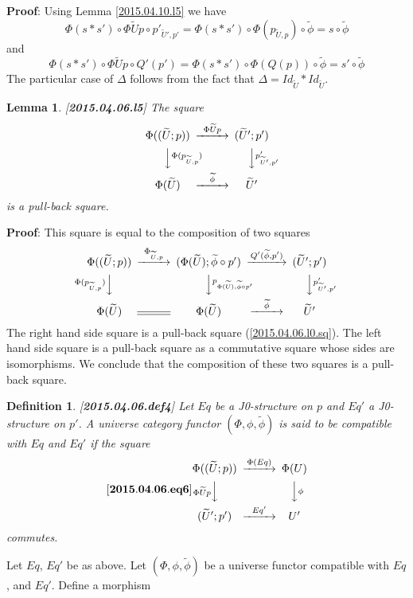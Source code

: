 \documentclass[12pt]{article}
\newenvironment{eq}{\begin{equation}}{\end{equation}}
\newenvironment{myproof}{{\bf Proof}:}{\vskip 5mm }
\newtheorem{lemma}[proposition]{Lemma}
\newtheorem{definition}[proposition]{Definition}
\newcommand{\llabel}[1]{\label{#1}[{\bf #1}]}
\newcommand{\wt}{\widetilde}
\begin{document}
%
\begin{myproof}
Using Lemma \ref{2015.04.10.l5} we have
%
$$\Phi(s*s')\circ \Phi\wt{U}p\circ p'_{\wt{U}',p'}=\Phi(s*s')\circ\Phi(p_{\wt{U},p})\circ\wt{\phi}=s\circ \wt{\phi}$$
%
and
%
$$\Phi(s*s')\circ \Phi\wt{U}p\circ Q'(p')=\Phi(s*s')\circ \Phi(Q(p))\circ \wt{\phi}=s'\circ\wt{\phi}$$
%
The particular case of $\Delta$ follows from the fact that $\Delta=Id_{\wt{U}}*Id_{\wt{U}}$. 
\end{myproof}
%
\begin{lemma}
\llabel{2015.04.06.l5}
The square
%
$$
\begin{CD}
\Phi((\wt{U};p)) @>\Phi\wt{U}p>> (\wt{U}';p')\\
@VV \Phi(p_{\wt{U},p}) V @VV p'_{\wt{U}',p'}V\\
\Phi(\wt{U}) @>\wt{\phi}>> \wt{U}'
\end{CD}
$$
%
is a pull-back square.
\end{lemma}
%
\begin{myproof}
This square is equal to the composition of two squares
%
$$
\begin{CD}
\Phi((\wt{U};p)) @>\Phi_{\wt{U},p}>> (\Phi(\wt{U});\wt{\phi}\circ p') @>Q'(\wt{\phi},p')>> (\wt{U}';p')\\
@V\Phi(p_{\wt{U},p}) VV @VV p_{\Phi(\wt{U}),\wt{\phi}\circ p'}V @VVp'_{\wt{U}',p'}V\\
\Phi(\wt{U}) @= \Phi(\wt{U}) @>\wt{\phi}>> \wt{U}'
\end{CD}
$$
%
The right hand side square is a pull-back square (\ref{2015.04.06.l0.sq}). The left hand side square is a pull-back square as a commutative square whose sides are isomorphisms. We conclude that the composition of these two squares is a pull-back square.
\end{myproof}
%
\begin{definition}
\llabel{2015.04.06.def4}
Let $Eq$ be a J0-structure on $p$ and $Eq'$ a J0-structure on $p'$. A universe category functor $(\Phi,\phi,\wt{\phi})$ is said to be compatible with $Eq$ and $Eq'$ if the square
%
\begin{eq}\llabel{2015.04.06.eq6}
\begin{CD}
\Phi((\wt{U};p)) @>\Phi(Eq)>> \Phi(U)\\
@V\Phi\wt{U}p VV @VV\phi V\\
(\wt{U}';p') @>Eq'>> U'
\end{CD}
\end{eq}
%
commutes.
\end{definition}
%
Let $Eq$, $Eq'$ be as above. Let $(\Phi,\phi,\wt{\phi})$ be a universe functor compatible with $Eq$, and $Eq'$. Define a morphism
\end{document}
